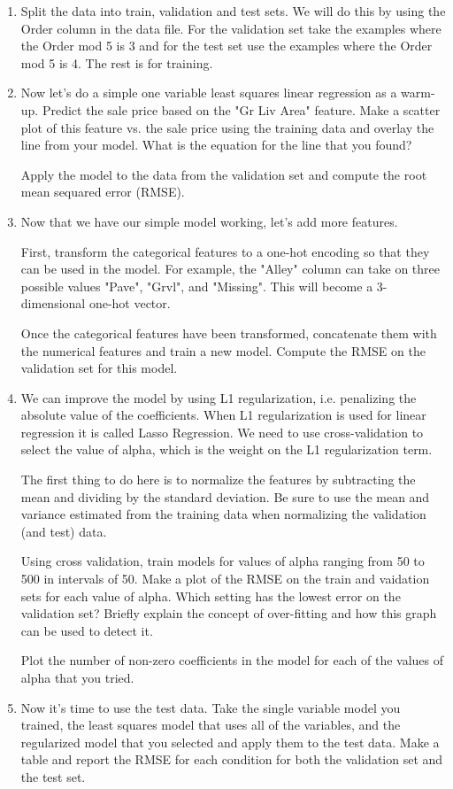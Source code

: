 \documentclass[letterpaper]{article}
\begin{document}
\begin{enumerate}
\item Split the data into train, validation and test sets. We will do this by using the Order column in the data file. For the validation set take the examples where the Order mod 5 is 3 and for the test set use the examples where the Order mod 5 is 4. The rest is for training.

\item Now let's do a simple one variable least squares linear regression as a warm-up. Predict the sale price based on the "Gr Liv Area" feature. Make a scatter plot of this feature vs. the sale price using the training data and overlay the line from your model. What is the equation for the line that you found? 

Apply the model to the data from the validation set and compute the root mean sequared error (RMSE).

\item Now that we have our simple model working, let's add more features. 

First, transform the categorical features to a one-hot encoding so that they can be used in the model. For example, the "Alley" column can take on three possible values "Pave", "Grvl", and "Missing". This will become a 3-dimensional one-hot vector.

Once the categorical features have been transformed, concatenate them with the numerical features and train a new model. Compute the RMSE on the validation set for this model. 

\item  We can improve the model by using L1 regularization, i.e. penalizing the absolute value of the coefficients. When L1 regularization is used for linear regression it is called Lasso Regression. We need to use cross-validation to select the value of alpha, which is the weight on the L1 regularization term.

The first thing to do here is to normalize the features by subtracting the mean and dividing by the standard deviation. Be sure to use the mean and variance estimated from the training data when normalizing the validation (and test) data. 

Using cross validation, train models for values of alpha ranging from 50 to 500 in intervals of 50. Make a plot of the RMSE on the train and vaidation sets for each value of alpha. Which setting has the lowest error on the validation set? Briefly explain the concept of over-fitting and how this graph can be used to detect it.

Plot the number of non-zero coefficients in the model for each of the values of alpha that you tried.

\item Now it's time to use the test data. Take the single variable model you trained, the least squares model that uses all of the variables, and the regularized model that you selected and apply them to the test data. Make a table and report the RMSE for each condition for both the validation set and the test set.

\end{enumerate}
\end{document}
